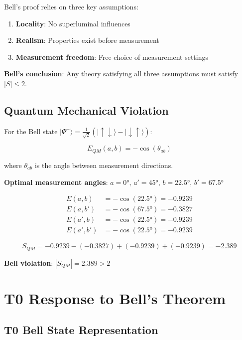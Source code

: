 	Bell's proof relies on three key assumptions:
	
	\begin{enumerate}
		\item \textbf{Locality}: No superluminal influences
		\item \textbf{Realism}: Properties exist before measurement
		\item \textbf{Measurement freedom}: Free choice of measurement settings
	\end{enumerate}
	
	\textbf{Bell's conclusion}: Any theory satisfying all three assumptions must satisfy $|S| \leq 2$.
	
	\subsection{Quantum Mechanical Violation}
	
	For the Bell state $|\Psi^-\rangle = \frac{1}{\sqrt{2}}(|\uparrow\downarrow\rangle - |\downarrow\uparrow\rangle)$:
	
	\begin{equation}
		E_{QM}(a,b) = -\cos(\theta_{ab})
	\end{equation}
	
	where $\theta_{ab}$ is the angle between measurement directions.
	
	\textbf{Optimal measurement angles}: $a = 0°$, $a' = 45°$, $b = 22.5°$, $b' = 67.5°$
	
	\begin{align}
		E(a,b) &= -\cos(22.5°) = -0.9239 \\
		E(a,b') &= -\cos(67.5°) = -0.3827 \\
		E(a',b) &= -\cos(22.5°) = -0.9239 \\
		E(a',b') &= -\cos(22.5°) = -0.9239
	\end{align}
	
	\begin{equation}
		S_{QM} = -0.9239 - (-0.3827) + (-0.9239) + (-0.9239) = -2.389
	\end{equation}
	
	\textbf{Bell violation}: $|S_{QM}| = 2.389 > 2$
	
	\section{T0 Response to Bell's Theorem}
	
	\subsection{T0 Bell State Representation}
	
